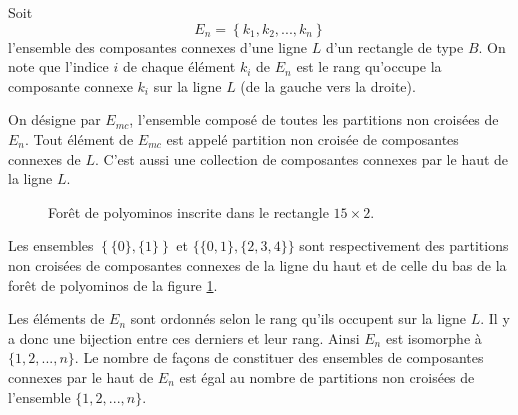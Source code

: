 \begin{Def}\label{defAt5}
Soit 
$$E_{n} = \left\lbrace k_{1},k_{2},...,k_{n} \right\rbrace$$
l'ensemble des composantes connexes d'une ligne $L$ d'un rectangle de type $B$.  On note que l'indice $i$ de chaque élément $k_{i}$ de $E_{n}$ est le rang qu'occupe la composante connexe $k_{i}$ sur la ligne $L$ (de la gauche vers la droite).
 
On désigne par $E_{mc}$, l'ensemble composé de toutes les partitions non croisées de $E_{n}$.
Tout élément de $E_{mc}$ est appelé  partition non croisée de composantes connexes de $L$. C'est aussi une collection de composantes connexes par le haut de la ligne $L$.
\end{Def}
\begin{Ex}\label{ex3}
\begin{figure}[!htb]
\begin{minipage}[c]{.16\linewidth}
        \centering
\end{minipage}
\hfill
\begin{minipage}[c]{.7\linewidth}
        \centering
\begin{logicpuzzle}[rows=2,columns=15,color=cyan!100, width=750px,scale=0.5]
\framepuzzle[black!50]
\end{logicpuzzle}
\end{minipage}
 \caption{\label{AtfigP} Forêt de polyominos inscrite dans le rectangle $15\times 2$.}
\end{figure} 
Les ensembles $\left\lbrace \{0\}, \{ 1\}\right\rbrace $  et $\{\{0,1\},\{2,3,4\}\}$ sont respectivement des partitions non croisées de composantes connexes  de la ligne du haut et de celle du bas de la forêt de polyominos de la figure \ref{AtfigP}.
\end{Ex}
\begin{Rem}\label{remeqq}
Les éléments de $E_{n}$ sont ordonnés selon le rang qu'ils occupent sur la ligne $L$. Il y a donc une bijection entre ces derniers et leur rang. Ainsi $E_{n}$ est isomorphe à $\{1,2,...,n\}.$ Le nombre de façons de constituer des ensembles de composantes connexes par le haut de $E_{n}$ est égal au nombre de partitions non croisées de  l'ensemble $\{1,2,...,n\}.$
\end{Rem}
